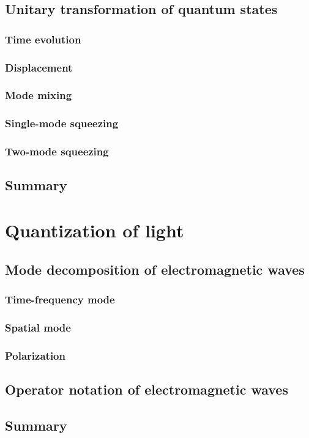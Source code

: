 \documentclass{book}
\begin{document}
\section{Unitary transformation of quantum states}
\subsection{Time evolution}
\subsection{Displacement}
\subsection{Mode mixing}
\subsection{Single-mode squeezing}
\subsection{Two-mode squeezing}
\section{Summary}

\chapter{Quantization of light}
\section{Mode decomposition of electromagnetic waves}
\subsection{Time-frequency mode}
\subsection{Spatial mode}
\subsection{Polarization}
\section{Operator notation of electromagnetic waves}
\section{Summary}
\end{document}
